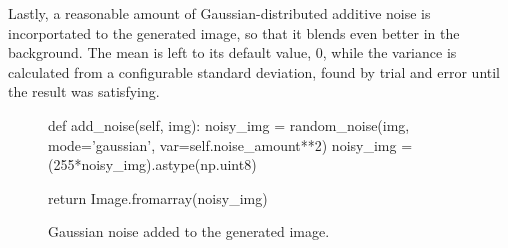 Lastly, a reasonable amount of Gaussian-distributed additive noise is
incorportated to the generated image, so that it blends even better in the
background. The mean is left to its default value, 0, while the variance is
calculated from a configurable standard deviation, found by trial and error
until the result was satisfying.

\begin{figure}[h]
    \centering
    \caption{Gaussian noise added to the generated image.}
    \begin{python}
        def add_noise(self, img):
            noisy_img = random_noise(img,
                                     mode='gaussian',
                                     var=self.noise_amount**2)
            noisy_img = (255*noisy_img).astype(np.uint8)

            return Image.fromarray(noisy_img)
    \end{python}
\end{figure}


